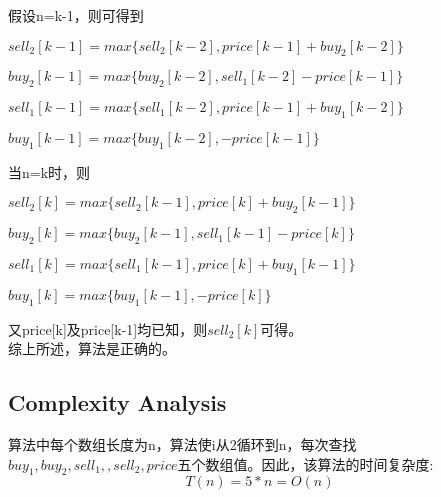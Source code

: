 \documentclass{article}
\begin{document}
假设n=k-1，则可得到

\begin{center} 
$sell_2[k-1]=max\{sell_2[k-2], price[k-1]+buy_2[k-2]\}$

$buy_2[k-1]=max\{buy_2[k-2], sell_1[k-2]-price[k-1]\}$

$sell_1[k-1]=max\{sell_1[k-2], price[k-1]+buy_1[k-2]\}$

$buy_1[k-1]=max\{buy_1[k-2], -price[k-1]\}$
\end{center} 

当n=k时，则

\begin{center} 
$sell_2[k]=max\{sell_2[k-1], price[k]+buy_2[k-1]\}$

$buy_2[k]=max\{buy_2[k-1], sell_1[k-1]-price[k]\}$

$sell_1[k]=max\{sell_1[k-1], price[k]+buy_1[k-1]\}$

$buy_1[k]=max\{buy_1[k-1], -price[k]\}$
\end{center} 

又price[k]及price[k-1]均已知，则$sell_2[k]$可得。
\\

综上所述，算法是正确的。

\subsection{Complexity Analysis}
算法中每个数组长度为n，算法使i从2循环到n，每次查找$buy_1,buy_2,sell_1,,sell_2,price$五个数组值。因此，该算法的时间复杂度:
\begin{equation}
T(n) = 5*n = O(n)
\end{equation}


\end{document}
